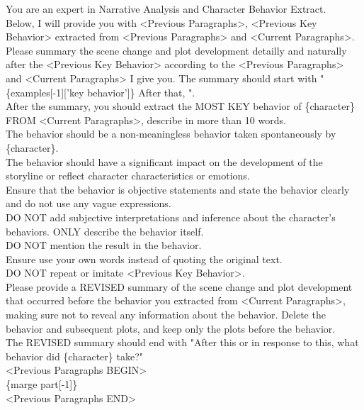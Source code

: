 \begin{tcolorbox}[title = {Next Behavior Generation Prompt}, breakable]
You are an expert in Narrative Analysis and Character Behavior Extract.\\
Below, I will provide you with <Previous Paragraphs>, <Previous Key Behavior> extracted from <Previous Paragraphs> and <Current Paragraphs>. \\

Please summary the scene change and plot development detailly and naturally after the <Previous Key Behavior> according to the <Previous Paragraphs> and <Current Paragraphs> I give you. The summary should start with "\{examples[-1]['key behavior']\} After that, ".\\

After the summary, you should extract the MOST KEY behavior of \{character\} FROM <Current Paragraphs>, describe in more than 10 words.\\
The behavior should be a non-meaningless behavior taken spontaneously by \{character\}.\\
The behavior should have a significant impact on the development of the storyline or reflect character characteristics or emotions.\\
Ensure that the behavior is objective statements and state the behavior clearly and do not use any vague expressions. \\
DO NOT add subjective interpretations and inference about the character's behaviors. ONLY describe the behavior itself. \\
DO NOT mention the result in the behavior.\\
Ensure use your own words instead of quoting the original text. \\
DO NOT repeat or imitate <Previous Key Behavior>. \\

Please provide a REVISED summary of the scene change and plot development that occurred before the behavior you extracted from <Current Paragraphs>, making sure not to reveal any information about the behavior. Delete the behavior and subsequent plots, and keep only the plots before the behavior.\\
The REVISED summary should end with "After this or in response to this, what behavior did \{character\} take?"\\

<Previous Paragraphs BEGIN>\\
\{marge part[-1]\}\\
<Previous Paragraphs END>\\


\end{tcolorbox}
